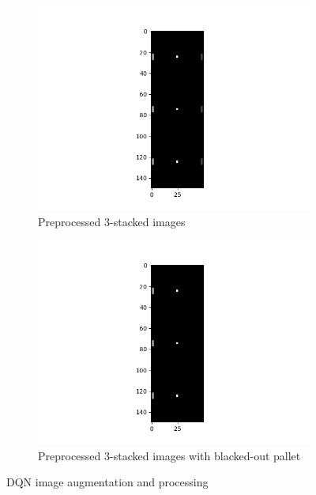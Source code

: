 \begin{figure}[!htb]
    \centering
    \begin{subfigure}{.49\textwidth}
        \centering
        \includegraphics[width=\textwidth]{figures/dqn_training_image.png}
        \caption{Preprocessed 3-stacked images}
        \label{fig-raw}
    \end{subfigure}
    \begin{subfigure}{0.49\textwidth}
        \centering
        \includegraphics[width=\textwidth]{figures/dqn_training_image_blacked_out_pallet.png}
        \caption{Preprocessed 3-stacked images with blacked-out pallet}
        \label{fig-bw}
    \end{subfigure}
    \caption{DQN image augmentation and processing}
    \label{fig-small}
    \label{fig-process}
\end{figure}

